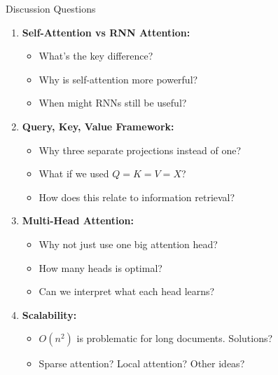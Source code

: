 \documentclass[aspectratio=169]{beamer}
\begin{document}
\begin{frame}[shrink=10]{Discussion Questions 💭}
\begin{enumerate}\setlength{\itemsep}{0pt}
    \item \textbf{Self-Attention vs RNN Attention:}
    \begin{itemize}\setlength{\itemsep}{0pt}
        \item What's the key difference?
        \item Why is self-attention more powerful?
        \item When might RNNs still be useful?
    \end{itemize}

    \vspace{0.5em}

    \item \textbf{Query, Key, Value Framework:}
    \begin{itemize}\setlength{\itemsep}{0pt}
        \item Why three separate projections instead of one?
        \item What if we used $Q = K = V = X$?
        \item How does this relate to information retrieval?
    \end{itemize}

    \vspace{0.5em}

    \item \textbf{Multi-Head Attention:}
    \begin{itemize}\setlength{\itemsep}{0pt}
        \item Why not just use one big attention head?
        \item How many heads is optimal?
        \item Can we interpret what each head learns?
    \end{itemize}

    \vspace{0.5em}

    \item \textbf{Scalability:}
    \begin{itemize}\setlength{\itemsep}{0pt}
        \item $O(n^2)$ is problematic for long documents. Solutions?
        \item Sparse attention? Local attention? Other ideas?
    \end{itemize}
\end{enumerate}
\end{frame}
\end{document}
